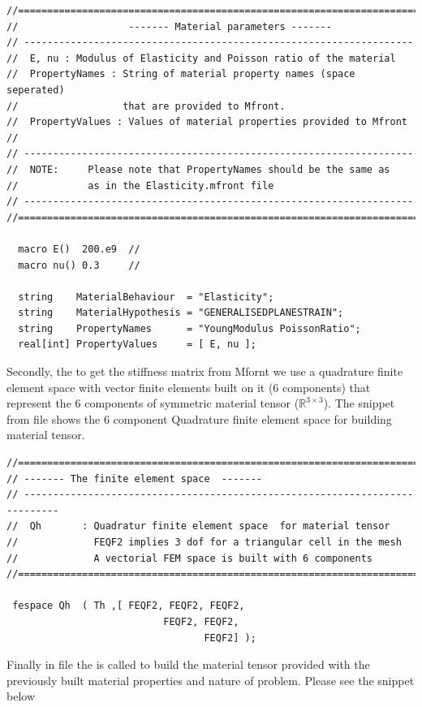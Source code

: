 \begin{lstlisting}[style=CppStyle]
//============================================================================
//                   ------- Material parameters -------
// -------------------------------------------------------------------
//  E, nu : Modulus of Elasticity and Poisson ratio of the material
//  PropertyNames : String of material property names (space seperated)
//                  that are provided to Mfront.
//  PropertyValues : Values of material properties provided to Mfront
//
// -------------------------------------------------------------------
//  NOTE:     Please note that PropertyNames should be the same as
//            as in the Elasticity.mfront file
// -------------------------------------------------------------------
//============================================================================

  macro E()  200.e9  //
  macro nu() 0.3     //

  string    MaterialBehaviour  = "Elasticity";
  string    MaterialHypothesis = "GENERALISEDPLANESTRAIN";
  string    PropertyNames      = "YoungModulus PoissonRatio";
  real[int] PropertyValues     = [ E, nu ];
\end{lstlisting}

Secondly, the to get the stiffness matrix from Mfornt we use a
quadrature finite element space with vector finite elements built on it
(6 components) that represent the 6 components of symmetric material
tensor (\(\mathbb R^{3 \times 3}\)). The snippet from
 file shows the 6 component Quadrature finite
element space for building material tensor.

\begin{lstlisting}[style=CppStyle]
//==============================================================================
// ------- The finite element space  -------
// ----------------------------------------------------------------------------
//  Qh       : Quadratur finite element space  for material tensor
//             FEQF2 implies 3 dof for a triangular cell in the mesh
//             A vectorial FEM space is built with 6 components
//==============================================================================

 fespace Qh  ( Th ,[ FEQF2, FEQF2, FEQF2,
                           FEQF2, FEQF2,
                                  FEQF2] );
\end{lstlisting}

Finally in file  the  is
called to build the material tensor  provided with the
previously built material properties and nature of problem. Please see
the snippet below

